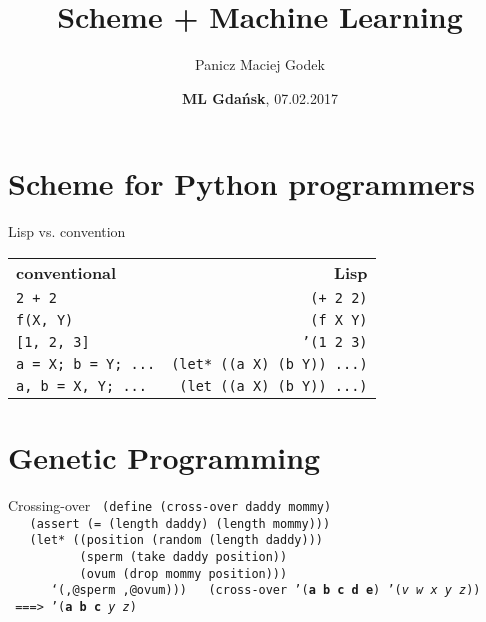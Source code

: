 \documentclass{beamer}
\title{\textbf{Scheme + Machine Learning}}
\author{Panicz Maciej Godek}
\institute{
  \tiny{\href{mailto:godek.maciek@gmail.com}{\textbf{godek.maciek@gmail.com}}}
}
\date{\textbf{ML Gdańsk}, 07.02.2017}
\begin{document}
\begin{frame}
  \titlepage
\end{frame}

\section{Scheme for Python programmers}

\begin{frame}{Lisp vs. convention}
  \begin{tabular}{ l r }
    \textbf{conventional} & \textbf{Lisp} \\ \pause
    \texttt{2 + 2} & \texttt{(+ 2 2)} \\ \pause
    \texttt{f(X, Y)} & \texttt{(f X Y)} \\ \pause
    \texttt{[1, 2, 3]} & \texttt{'(1 2 3)} \\ \pause
    \texttt{a = X; b = Y; ...} & \texttt{(let* ((a X) (b Y)) ...)} \\ \pause
    \texttt{a, b = X, Y; ...} & \texttt{(let ((a X) (b Y)) ...)} \\
  \end{tabular}
\end{frame}

\section{Genetic Programming}

\begin{frame}{Crossing-over}
  \texttt{
(define (cross-over daddy mommy)\\ \pause
\ \ \ (assert (= (length daddy) (length mommy)))\\ \pause
\ \ \ (let* ((position (random (length daddy)))\\ \pause
\ \ \ \ \ \ \ \ \ \ (sperm (take daddy position))\\ \pause
\ \ \ \ \ \ \ \ \ \ (ovum (drop mommy position)))\\ \pause
\ \ \ \ \ \ `(,@sperm ,@ovum))) \\ \pause
\ \\
(cross-over '(\textbf{a b c d e}) '(\textit{v w x y z})) \\ \pause
\ ===> '(\textbf{a b c} \textit{y z})
}
\end{frame}
\end{document}
